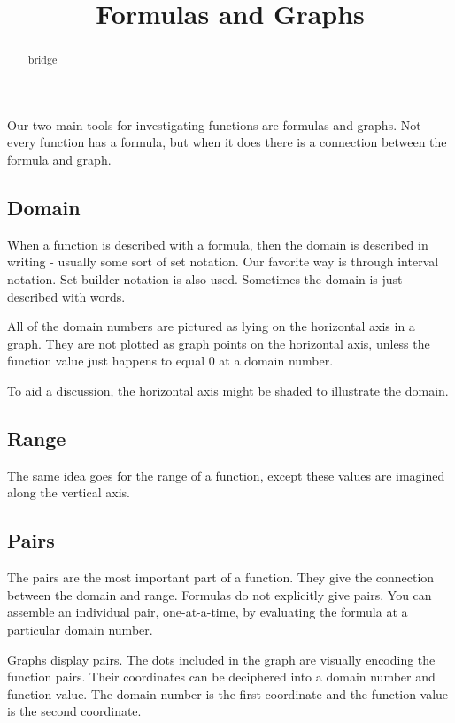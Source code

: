 \documentclass{ximera}
\title{Formulas and Graphs}
\begin{document}
\begin{abstract}
bridge
\end{abstract}
\maketitle



Our two main tools for investigating functions are formulas and graphs. Not every function has a formula, but when it does there is a connection between the formula and graph.

\subsection*{Domain}
When a function is described with a formula, then the domain is described in writing - usually some sort of set notation.  Our favorite way is through interval notation.  Set builder notation is also used.  Sometimes the domain is just described with words.

All of the domain numbers are pictured as lying on the horizontal axis in a graph.  They are not plotted as graph points on the horizontal axis, unless the function value just happens to equal $0$ at a domain number.

To aid a discussion, the horizontal axis might be shaded to illustrate the domain.







\subsection*{Range}
The same idea goes for the range of a function, except these values are imagined along the vertical axis.








\subsection*{Pairs}
The pairs are the most important part of a function.  They give the connection between the domain and range.  Formulas do not explicitly give pairs. You can assemble an individual pair, one-at-a-time, by evaluating the formula at a particular domain number.

Graphs display pairs.  The dots included in the graph are visually encoding the function pairs.  Their coordinates can be deciphered into a domain number and function value. The domain number is the first coordinate and the function value is the second coordinate.
\end{document}
